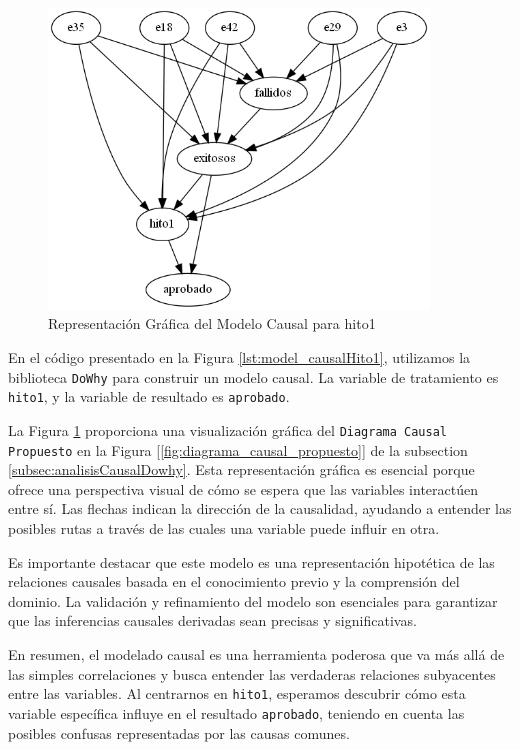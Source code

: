\begin{figure}[H]


        \centering
        \includegraphics[width=0.9\textwidth]{img/causalidad/graph_causal_model_hito1.png}
        \caption{Representación Gráfica del Modelo Causal para hito1}
        \label{fig:modelo_causal_hito1}

\end{figure}

En el código presentado en la Figura \ref{lst:model_causalHito1}, utilizamos la biblioteca \texttt{DoWhy} para construir un modelo causal. La variable de tratamiento es \texttt{hito1}, y la variable de resultado es \texttt{aprobado}. 

La Figura \ref{fig:modelo_causal_hito1} proporciona una visualización gráfica del \texttt{Diagrama Causal Propuesto} en la Figura  [\ref{fig:diagrama_causal_propuesto}] de la subsection \ref{subsec:analisisCausalDowhy}. Esta representación gráfica es esencial porque ofrece una perspectiva visual de cómo se espera que las variables interactúen entre sí. Las flechas indican la dirección de la causalidad, ayudando a entender las posibles rutas a través de las cuales una variable puede influir en otra.

Es importante destacar que este modelo es una representación hipotética de las relaciones causales basada en el conocimiento previo y la comprensión del dominio. La validación y refinamiento del modelo son esenciales para garantizar que las inferencias causales derivadas sean precisas y significativas.

En resumen, el modelado causal es una herramienta poderosa que va más allá de las simples correlaciones y busca entender las verdaderas relaciones subyacentes entre las variables. Al centrarnos en \texttt{hito1}, esperamos descubrir cómo esta variable específica influye en el resultado \texttt{aprobado}, teniendo en cuenta las posibles confusas representadas por las causas comunes.


